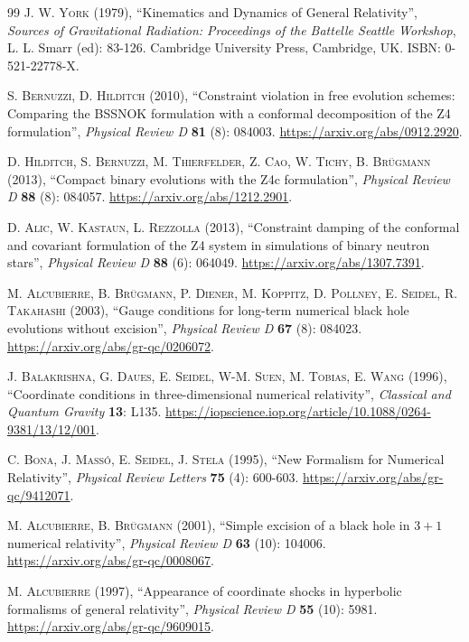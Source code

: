 \documentclass{article}
\begin{document}
\begin{thebibliography}{99}
\textsc{J. W. York} (1979), ``Kinematics and Dynamics of General Relativity'', \textit{Sources of Gravitational Radiation: Proceedings of the Battelle Seattle Workshop}, L. L. Smarr (ed): 83-126. Cambridge University Press, Cambridge, UK. ISBN: 0-521-22778-X.

\textsc{S. Bernuzzi, D. Hilditch} (2010), ``Constraint violation in free evolution schemes: Comparing the BSSNOK formulation with a conformal decomposition of the Z4 formulation'', \textit{Physical Review D} \textbf{81} (8): 084003. \url{https://arxiv.org/abs/0912.2920}.

\textsc{D. Hilditch, S. Bernuzzi, M. Thierfelder, Z. Cao, W. Tichy, B. Br\"ugmann} (2013), ``Compact binary evolutions with the Z4c formulation'', \textit{Physical Review D} \textbf{88} (8): 084057. \url{https://arxiv.org/abs/1212.2901}.

\textsc{D. Alic, W. Kastaun, L. Rezzolla} (2013), ``Constraint damping of the conformal and covariant formulation of the Z4 system in simulations of binary neutron stars'', \textit{Physical Review D} \textbf{88} (6): 064049. \url{https://arxiv.org/abs/1307.7391}.

\textsc{M. Alcubierre, B. Br\"ugmann, P. Diener, M. Koppitz, D. Pollney, E. Seidel, R. Takahashi} (2003), ``Gauge conditions for long-term numerical black hole evolutions without excision'', \textit{Physical Review D} \textbf{67} (8): 084023. \url{https://arxiv.org/abs/gr-qc/0206072}.

\textsc{J. Balakrishna, G. Daues, E. Seidel, W-M. Suen, M. Tobias, E. Wang} (1996), ``Coordinate conditions in three-dimensional numerical relativity'', \textit{Classical and Quantum Gravity} \textbf{13}: L135. \url{https://iopscience.iop.org/article/10.1088/0264-9381/13/12/001}.

\textsc{C. Bona, J. Mass\'o, E. Seidel, J. Stela} (1995), ``New Formalism for Numerical Relativity'', \textit{Physical Review Letters} \textbf{75} (4): 600-603. \url{https://arxiv.org/abs/gr-qc/9412071}.

\textsc{M. Alcubierre, B. Br\"ugmann} (2001), ``Simple excision of a black hole in ${3 + 1}$ numerical relativity'', \textit{Physical Review D} \textbf{63} (10): 104006. \url{https://arxiv.org/abs/gr-qc/0008067}.

\textsc{M. Alcubierre} (1997), ``Appearance of coordinate shocks in hyperbolic formalisms of general relativity'', \textit{Physical Review D} \textbf{55} (10): 5981. \url{https://arxiv.org/abs/gr-qc/9609015}.


\end{thebibliography}
\end{document}
